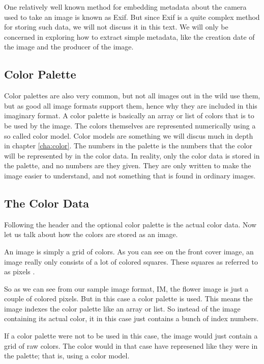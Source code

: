 One relatively well known method for embedding metadata about the
camera used to take an image is known as
Exif\cite{camera:_cipa_dc_trans_exchan}. But since Exif is a quite
complex method for storing such data, we will not discuss it in this
text. We will only be concerned in exploring how to extract simple
metadata, like the creation date of the image and the producer of the
image.

\subsection{Color Palette}

Color palettes  are also very common, but not all
images out in the wild use them, but as good all image formats support
them, hence why they are included in this imaginary format. A color
palette is basically an array or list of colors that is to be used by
the image. The colors themselves are represented numerically using a
so called color model. Color models are something we will discus much
in depth in chapter \ref{cha:color}. The numbers in the palette is the
numbers that the color will be represented by in the color data. In
reality, only the color data is stored in the palette, and no numbers
are they given. They are only written to make the image easier to
understand, and not something that is found in ordinary images.

\subsection{The Color Data}

Following the header and the optional color palette is the actual
color data. Now let us talk about how the colors are stored as an
image.

An image is simply a grid of colors. As you can see on the front cover
image, an image really only consists of a lot of colored
squares. These squares as referred to as pixels
\cite{murray1996encyclopedia}.

So as we can see from our sample image format, IM, the flower image
is just a couple of colored pixels. But in this case a color palette
is used. This means the image indexes the color palette like an
array or list. So instead of the image containing its actual color,
it in this case just contains a bunch of index numbers.

If a color palette were not to be used in this case, the image would
just contain a grid of raw colors. The color would in that case have
represened like they were in the palette; that is, using a color
model.

